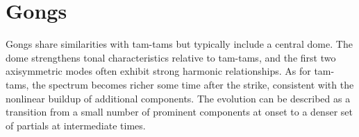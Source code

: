 \section{Gongs}

Gongs share similarities with tam-tams but typically include a central dome. The dome strengthens tonal characteristics relative to tam-tams, and the first two axisymmetric modes often exhibit strong harmonic relationships. As for tam-tams, the spectrum becomes richer some time after the strike, consistent with the nonlinear buildup of additional components. The evolution can be described as a transition from a small number of prominent components at onset to a denser set of partials at intermediate times. 
